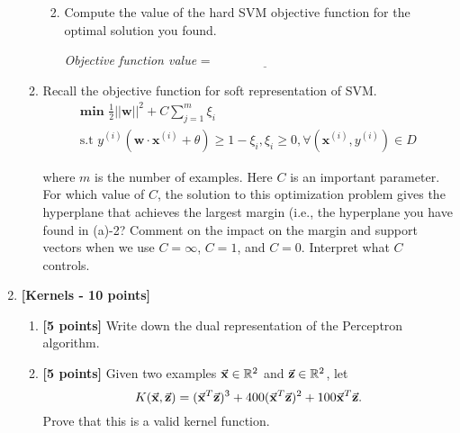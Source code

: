 \begin{enumerate}
\begin{enumerate}
\begin{enumerate}
 \vspace{.2in}

\vspace{.2in}

\item[3.][$6$ points] Compute the value of the hard SVM objective function for the optimal solution you found.


 \vspace{.2in}
\emph{Objective function value} =  $\underline{\qquad\qquad\qquad\qquad}$
\vspace{.2in}
\end{enumerate}

\item[(c)][$13$ points] Recall the objective function for soft representation of SVM.
\begin{gather}
\textbf{min }   \frac{1}{2}||\mathbf{w}||^{2} + C\sum_{j=1}^{m}{\xi_{i}} \\
\text{s.t  } y^{(i)}(\mathbf{w}\cdot\mathbf{x}^{(i)}+\theta)\geq 1 - \xi_{i}, \xi_i\geq0, \forall (\mathbf{x}^{(i)},y^{(i)})\in D
\end{gather}

where $m$ is the number of examples. Here $C$ is an important parameter. For which value of $C$, the solution to this optimization problem gives the hyperplane that achieves the largest margin (i.e., the hyperplane you have found in (a)-2? Comment on the impact on the margin and support vectors when we use $C = \infty$, $C = 1$, and $C = 0$.	Interpret what $C$ controls. 
\vspace{.7in}

\end{enumerate}

\item {\bf [Kernels - 10 points]}
  \begin{enumerate}
  \item {\bf [5 points]} Write down the dual representation of the
    Perceptron algorithm.

  \item {\bf [5 points]} Given two examples $\vec{\bf x} \in \mathbb{R}^2$ and
    $\vec{\bf z} \in \mathbb{R}^2$, let
    \begin{equation*}
      K(\vec{\bf x},\vec{\bf z}) = (\vec{\bf x}^T\vec{\bf z})^3 + 400(\vec{\bf x}^T\vec{\bf z})^2 + 100 \vec{\bf x}^T\vec{\bf z}.
    \end{equation*}
    Prove that this is a valid kernel function.

  \end{enumerate}


\end{enumerate}

